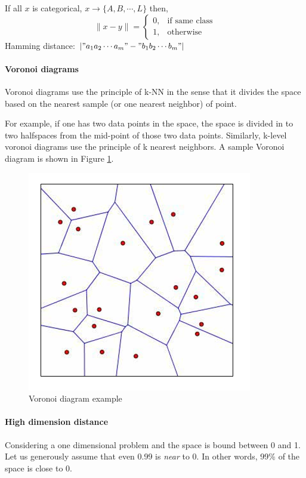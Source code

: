 \documentclass{article}
\begin{document}
{{        If all $x$ is categorical, \(x \rightarrow \{A,B,\cdots,L\}\) then,
        \[\| x - y\| = \begin{cases}
            0,  &  \text{if same class}\\
            1,  &  \text{otherwise}
        \end{cases}\]
        Hamming distance: \(| "a_1a_2\cdots a_m" - "b_1b_2\cdots b_m" |\)

        \paragraph{Voronoi diagrams}{
            Voronoi diagrams use the principle of k-NN in the sense that it divides the space based on the nearest sample (or one nearest neighbor) of point. 

            For example, if one has two data points in the space, the space is divided in to two halfspaces from the mid-point of those two data points. Similarly, k-level voronoi diagrams use the principle of k nearest neighbors. A sample Voronoi diagram is shown in Figure \ref{Fig.2}.
            \begin{figure}
                \label{Fig.2}   
                \begin{center}
                    \includegraphics[scale=0.5]{voronoiExample.PNG}
                    \caption{Voronoi diagram example}
                \end{center}
            \end{figure}
        }

        \paragraph{High dimension distance}{
            Considering a one dimensional problem and the space is bound between 0 and 1. Let us generously assume that even 0.99 is \textit{near} to 0. In other words, 99\% of the space is close to 0. 

}}}
\end{document}
